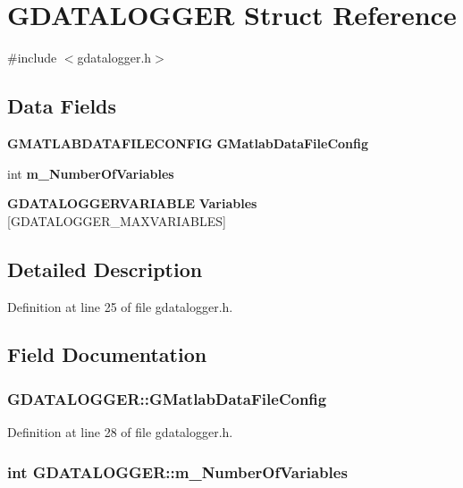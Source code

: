 \section{GDATALOGGER Struct Reference}
\label{structGDATALOGGER}


{\ttfamily \#include $<$gdatalogger.h$>$}\subsection*{Data Fields}
\begin{DoxyCompactItemize}
\item 
{\bf GMATLABDATAFILECONFIG} {\bf GMatlabDataFileConfig}
\item 
int {\bf m\_\-NumberOfVariables}
\item 
{\bf GDATALOGGERVARIABLE} {\bf Variables} [GDATALOGGER\_\-MAXVARIABLES]
\end{DoxyCompactItemize}


\subsection{Detailed Description}


Definition at line 25 of file gdatalogger.h.

\subsection{Field Documentation}
\subsubsection[{GMatlabDataFileConfig}]{ {\bf GDATALOGGER::GMatlabDataFileConfig}}\label{structGDATALOGGER_a062fd3836dbd0b1bec129ab372bff04a}


Definition at line 28 of file gdatalogger.h.
\subsubsection[{m\_\-NumberOfVariables}]{\setlength{\rightskip}{0pt plus 5cm}int {\bf GDATALOGGER::m\_\-NumberOfVariables}}\label{structGDATALOGGER_a2ac727ee6c50f7e04030cbe531158f08}


